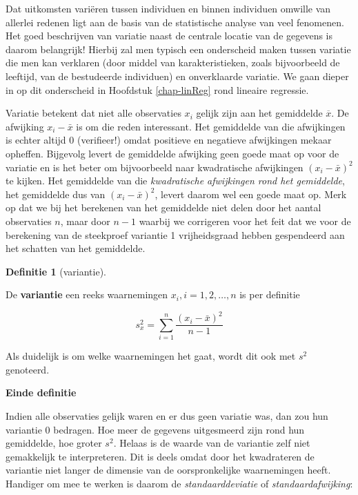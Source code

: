 \documentclass[
  12pt,dutch,coursenotes]{book}
\theoremstyle{definition}
\newtheorem{definition}{Definitie}[chapter]
\theoremstyle{definition}
\theoremstyle{definition}
\theoremstyle{definition}
\theoremstyle{remark}
\begin{document}
Dat uitkomsten variëren tussen individuen en binnen individuen omwille van
allerlei redenen ligt aan de basis van de statistische analyse van veel
fenomenen. Het goed beschrijven van variatie naast de centrale locatie van
de gegevens is daarom belangrijk! Hierbij zal men typisch een
onderscheid maken tussen variatie die men kan verklaren (door middel van
karakteristieken, zoals bijvoorbeeld de leeftijd, van de bestudeerde individuen) en onverklaarde variatie. We gaan
dieper in op dit onderscheid in Hoofdstuk \ref{chap-linReg} rond lineaire regressie.

Variatie betekent dat niet alle observaties \(x_i\) gelijk zijn aan het
gemiddelde \(\overline{x}\). De afwijking \(x_i - \bar{x}\) is om die reden
interessant. Het gemiddelde van die afwijkingen is echter altijd 0
(verifieer!) omdat positieve en negatieve afwijkingen mekaar opheffen.
Bijgevolg levert de gemiddelde afwijking geen goede maat op voor de variatie
en is het beter om bijvoorbeeld naar kwadratische afwijkingen \((x_i - \bar{x})^2\) te kijken. Het gemiddelde van die \emph{kwadratische afwijkingen rond het gemiddelde}, het gemiddelde dus van \((x_i - \bar{x})^2\), levert daarom
wel een goede maat op. Merk op dat we bij het berekenen van het gemiddelde niet delen door het aantal observaties \(n\), maar door \(n-1\) waarbij we corrigeren voor het feit dat we voor de berekening van de steekproef variantie 1 vrijheidsgraad hebben gespendeerd aan het schatten van het gemiddelde.

\begin{definition}[variantie]
\protect\hypertarget{def:unnamed-chunk-101}{}{\label{def:unnamed-chunk-101} {} }
\end{definition}
De \textbf{variantie} een reeks waarnemingen \(x_i, i=1, 2, \dots, n\) is per
definitie

\begin{equation*}
s^2_x = \sum_{i=1}^{n} \frac{(x_i - \bar{x})^2}{n-1}
\end{equation*}

Als duidelijk is om welke waarnemingen het gaat, wordt dit ook met \(s^2\)
genoteerd.

\textbf{Einde definitie}

Indien alle observaties gelijk waren en er dus geen variatie was, dan zou
hun variantie 0 bedragen. Hoe meer de gegevens uitgesmeerd zijn rond hun
gemiddelde, hoe groter \(s^2\). Helaas is de waarde van de variantie zelf niet
gemakkelijk te interpreteren. Dit is deels omdat door het kwadrateren de
variantie niet langer de dimensie van de oorspronkelijke waarnemingen heeft.
Handiger om mee te werken is daarom de \emph{standaarddeviatie} of \emph{
standaardafwijking}:
\end{document}
